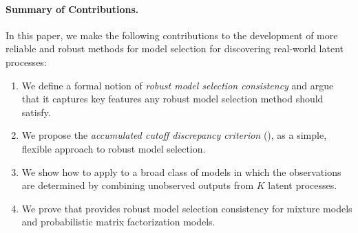 \paragraph{Summary of Contributions.}
In this paper, we make the following contributions to the development of more reliable
and robust methods for model selection for discovering real-world latent processes:
\begin{enumerate}
    \item We define a formal notion of \textit{robust model selection consistency}
    and argue that it captures key features any robust model selection method 
    should satisfy. 
	\item We propose the \emph{accumulated cutoff discrepancy criterion} (\methodname), as a simple, flexible approach to robust model selection. 
	\item We show how to apply \methodname to a broad class of models
	in which the observations are determined by combining unobserved outputs from $K$ latent processes.
	\item We prove that \methodname provides robust model selection 
    consistency for mixture models and probabilistic matrix factorization models. 

\end{enumerate}
